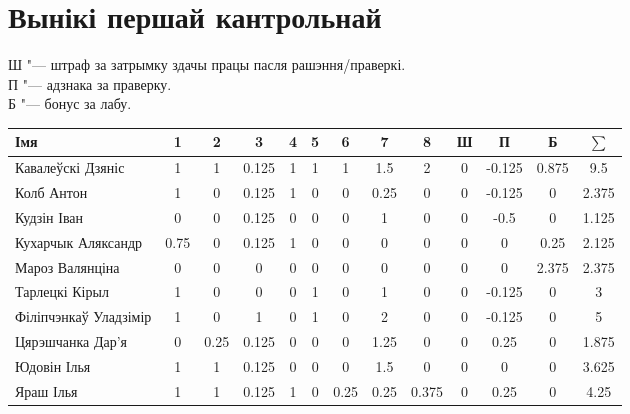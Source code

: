 \documentclass[12pt, a4paper]{extarticle}
\begin{document}
	\section{Вынікі першай кантрольнай}
	\noindent Ш "--- штраф за затрымку здачы працы пасля рашэння/праверкі. \\
	П "--- адзнака за праверку. \\
	Б "--- бонус за лабу.
\begin{table}[H]
    \begin{tabular}{|l|c|c|c|c|c|c|c|c|c|c|c|c|}
        \hline
   		Імя                   &  1   &  2   &   3   & 4 & 5 &  6   &  7   &   8   & Ш &   П    &   Б   & $\sum$ \\ \hline
   		Кавалеўскі Дзяніс     &  1   &  1   & 0.125 & 1 & 1 &  1   &  1.5 &   2   & 0 & -0.125 & 0.875 &   9.5  \\ \hline
   		Колб Антон            &  1   &  0   & 0.125 & 1 & 0 &  0   & 0.25 &   0   & 0 & -0.125 &   0   &  2.375 \\ \hline
   		Кудзін Іван           &  0   &  0   & 0.125 & 0 & 0 &  0   &  1   &   0   & 0 &  -0.5  &   0   &  1.125 \\ \hline
   		Кухарчык Аляксандр    & 0.75 &  0   & 0.125 & 1 & 0 &  0   &  0   &   0   & 0 &   0    &  0.25 &  2.125 \\ \hline
   		Мароз Валянціна       &  0   &  0   &   0   & 0 & 0 &  0   &  0   &   0   & 0 &   0    & 2.375 &  2.375 \\ \hline
   		Тарлецкі Кірыл        &  1   &  0   &   0   & 0 & 1 &  0   &  1   &   0   & 0 & -0.125 &   0   &   3    \\ \hline
   		Філіпчэнкаў Уладзімір &  1   &  0   &   1   & 0 & 1 &  0   &  2   &   0   & 0 & -0.125 &   0   &   5    \\ \hline
   		Цярэшчанка Дар'я      &  0   & 0.25 & 0.125 & 0 & 0 &  0   & 1.25 &   0   & 0 &  0.25  &   0   &  1.875 \\ \hline
   		Юдовін Ілья           &  1   &  1   & 0.125 & 0 & 0 &  0   &  1.5 &   0   & 0 &   0    &   0   &  3.625 \\ \hline
   		Яраш Ілья             &  1   &  1   & 0.125 & 1 & 0 & 0.25 & 0.25 & 0.375 & 0 &  0.25  &   0   &  4.25  \\ \hline
	\end{tabular}
\end{table}
\end{document}
